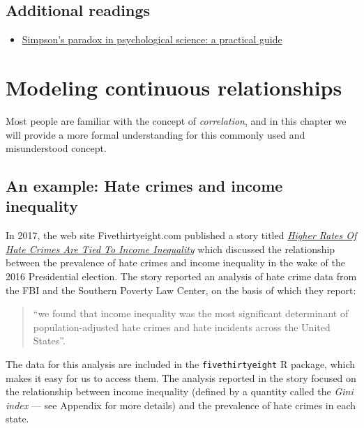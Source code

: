 \documentclass[12pt,]{book}
\providecommand{\tightlist}{%
  \setlength{\itemsep}{0pt}\setlength{\parskip}{0pt}}
\theoremstyle{definition}
\theoremstyle{definition}
\theoremstyle{definition}
\theoremstyle{remark}
\begin{document}
\hypertarget{additional-readings}{%
\section{Additional readings}\label{additional-readings}}

\begin{itemize}
\tightlist
\item
  \href{https://www.frontiersin.org/articles/10.3389/fpsyg.2013.00513/full}{Simpson's paradox in psychological science: a practical guide}
\end{itemize}

\hypertarget{modeling-continuous-relationships}{%
\chapter{Modeling continuous relationships}\label{modeling-continuous-relationships}}

Most people are familiar with the concept of \emph{correlation}, and in this chapter we will provide a more formal understanding for this commonly used and misunderstood concept.

\hypertarget{an-example-hate-crimes-and-income-inequality}{%
\section{An example: Hate crimes and income inequality}\label{an-example-hate-crimes-and-income-inequality}}

In 2017, the web site Fivethirtyeight.com published a story titled \href{https://fivethirtyeight.com/features/higher-rates-of-hate-crimes-are-tied-to-income-inequality/}{\emph{Higher Rates Of Hate Crimes Are Tied To Income Inequality}} which discussed the relationship between the prevalence of hate crimes and income inequality in the wake of the 2016 Presidential election. The story reported an analysis of hate crime data from the FBI and the Southern Poverty Law Center, on the basis of which they report:

\begin{quote}
``we found that income inequality was the most significant determinant of population-adjusted hate crimes and hate incidents across the United States''.
\end{quote}

The data for this analysis are included in the \texttt{fivethirtyeight} R package, which makes it easy for us to access them. The analysis reported in the story focused on the relationship between income inequality (defined by a quantity called the \emph{Gini index} --- see Appendix for more details) and the prevalence of hate crimes in each state.
\end{document}
